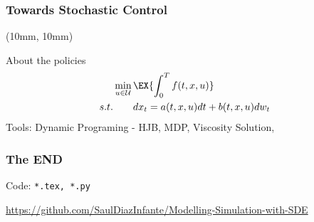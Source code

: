 \begin{frame}
    \frametitle{Towards Stochastic Control}
    \begin{textblock*}{72mm}(10mm, 10mm)
        \begin{graybox}{About the policies}
            \begin{align*}
                &
                \min_{u\in \mathcal{U}} \EX{\int_0^T f(t,x,u)}
                \\
                s.t.& 
                    \qquad dx_t = a(t,x,u)dt
                        + b(t,x,u) dw_t
            \end{align*}
        Tools: Dynamic Programing - HJB, MDP, Viscosity Solution,
        \end{graybox}    
    \end{textblock*}
\end{frame}
\begin{frame}
    \frametitle{The END}
    \begin{graybox}{Code: \texttt{*.tex, *.py}}
        \begin{center}
            \href{
               https://github.com/SaulDiazInfante/Modelling-Simulation-with-SDE%
            }%
            {https://github.com/SaulDiazInfante/Modelling-Simulation-with-SDE}
        \end{center}
    \end{graybox}
\end{frame}